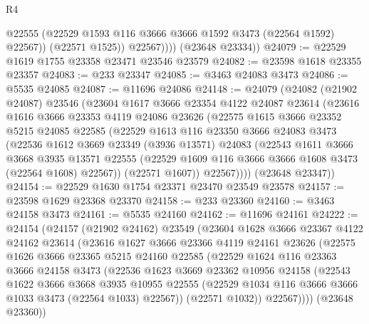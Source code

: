 \begin{lexlean}{R4}
\begin{coremodule}
                  @22555
                  (@22529 @1593 @116 @3666 @3666 @1592 @3473 (@22564 @1592) @22567))
                (@22571 @1525))
              @22567))))
      (@23648 @23334))
@24079 := @22529 @1619 @1755 @23358 @23471 @23546 @23579
@24082 := @23598 @1618 @23355 @23357
@24083 := @233 @23347
@24085 := @3463 @24083 @3473
@24086 := @5535 @24085
@24087 := @11696 @24086
@24148 := @24079
    (@24082
      (@21902 @24087)
      @23546
      (@23604
        @1617
        @3666
        @23354
        @4122
        @24087
        @23614
        (@23616
          @1616
          @3666
          @23353
          @4119
          @24086
          @23626
          (@22575
            @1615
            @3666
            @23352
            @5215
            @24085
            @22585
            (@22529
              @1613
              @116
              @23350
              @3666
              @24083
              @3473
              (@22536
                @1612
                @3669
                @23349
                (@3936 @13571)
                @24083
                (@22543
                  @1611
                  @3666
                  @3668
                  @3935
                  @13571
                  @22555
                  (@22529 @1609 @116 @3666 @3666 @1608 @3473 (@22564 @1608) @22567))
                (@22571 @1607))
              @22567))))
      (@23648 @23347))
@24154 := @22529 @1630 @1754 @23371 @23470 @23549 @23578
@24157 := @23598 @1629 @23368 @23370
@24158 := @233 @23360
@24160 := @3463 @24158 @3473
@24161 := @5535 @24160
@24162 := @11696 @24161
@24222 := @24154
    (@24157
      (@21902 @24162)
      @23549
      (@23604
        @1628
        @3666
        @23367
        @4122
        @24162
        @23614
        (@23616
          @1627
          @3666
          @23366
          @4119
          @24161
          @23626
          (@22575
            @1626
            @3666
            @23365
            @5215
            @24160
            @22585
            (@22529
              @1624
              @116
              @23363
              @3666
              @24158
              @3473
              (@22536
                @1623
                @3669
                @23362
                @10956
                @24158
                (@22543
                  @1622
                  @3666
                  @3668
                  @3935
                  @10955
                  @22555
                  (@22529 @1034 @116 @3666 @3666 @1033 @3473 (@22564 @1033) @22567))
                (@22571 @1032))
              @22567))))
      (@23648 @23360))

\end{coremodule}
\end{lexlean}
